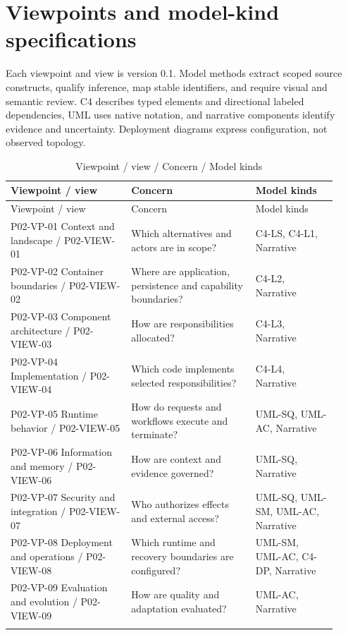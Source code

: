 \documentclass[10pt,letterpaper]{article}
\begin{document}
\section{Viewpoints and model-kind specifications}
Each viewpoint and view is version 0.1. Model methods extract scoped source constructs, qualify inference, map stable identifiers, and require visual and semantic review. C4 describes typed elements and directional labeled dependencies, UML uses native notation, and narrative components identify evidence and uncertainty. Deployment diagrams express configuration, not observed topology.
\begin{longtable}{@{}>{\raggedright\arraybackslash}p{0.34\linewidth}>{\raggedright\arraybackslash}p{0.35\linewidth}>{\raggedright\arraybackslash}p{0.23\linewidth}@{}}
\caption{Viewpoint / view / Concern / Model kinds}\\
\toprule Viewpoint / view & Concern & Model kinds\\\midrule\endfirsthead
\toprule Viewpoint / view & Concern & Model kinds\\\midrule\endhead
P02-VP-01 Context and landscape / P02-VIEW-01 & Which alternatives and actors are in scope? & C4-LS, C4-L1, Narrative\\\addlinespace
P02-VP-02 Container boundaries / P02-VIEW-02 & Where are application, persistence and capability boundaries? & C4-L2, Narrative\\\addlinespace
P02-VP-03 Component architecture / P02-VIEW-03 & How are responsibilities allocated? & C4-L3, Narrative\\\addlinespace
P02-VP-04 Implementation / P02-VIEW-04 & Which code implements selected responsibilities? & C4-L4, Narrative\\\addlinespace
P02-VP-05 Runtime behavior / P02-VIEW-05 & How do requests and workflows execute and terminate? & UML-SQ, UML-AC, Narrative\\\addlinespace
P02-VP-06 Information and memory / P02-VIEW-06 & How are context and evidence governed? & UML-SQ, Narrative\\\addlinespace
P02-VP-07 Security and integration / P02-VIEW-07 & Who authorizes effects and external access? & UML-SQ, UML-SM, UML-AC, Narrative\\\addlinespace
P02-VP-08 Deployment and operations / P02-VIEW-08 & Which runtime and recovery boundaries are configured? & UML-SM, UML-AC, C4-DP, Narrative\\\addlinespace
P02-VP-09 Evaluation and evolution / P02-VIEW-09 & How are quality and adaptation evaluated? & UML-AC, Narrative\\\addlinespace
\bottomrule\end{longtable}
\end{document}
